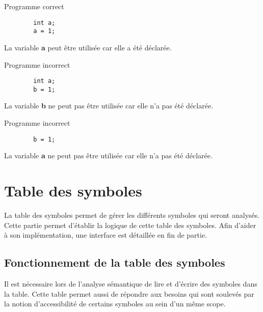 \documentclass{../../res/univ-projet}
\begin{document}
      \begin{multicols}{3}
        {\color{success} Programme correct}\\

        \begin{verbatim}
        int a;
        a = 1;

        \end{verbatim}

        {\color{success} La variable {\bfseries a} peut être utilisée car elle a été déclarée.}

      \columnbreak

        {\color{danger} Programme incorrect}\\

        \begin{verbatim}
        int a;
        b = 1;
        \end{verbatim}

        {\color{danger} La variable {\bfseries b} ne peut pas être utilisée car elle n'a pas été déclarée.}
      

      \columnbreak

        {\color{danger} Programme incorrect}\\

        \begin{verbatim}
        b = 1;
        \end{verbatim}

        {\color{danger} La variable {\bfseries a} ne peut pas être utilisée car elle n'a pas été déclarée.}
      \end{multicols}

\section{Table des symboles}

La table des symboles permet de gérer les différents symboles qui seront analysés. Cette partie permet d'établir la logique de cette table des symboles. Afin d'aider à son implémentation, une interface est détaillée en fin de partie.

  \subsection{Fonctionnement de la table des symboles}
    Il est nécessaire lors de l'analyse sémantique de lire et d'écrire des symboles dans la table. Cette table permet aussi de répondre aux besoins qui sont soulevés par la notion d'accessibilité de certains symboles au sein d'un même scope.\\
\end{document}
